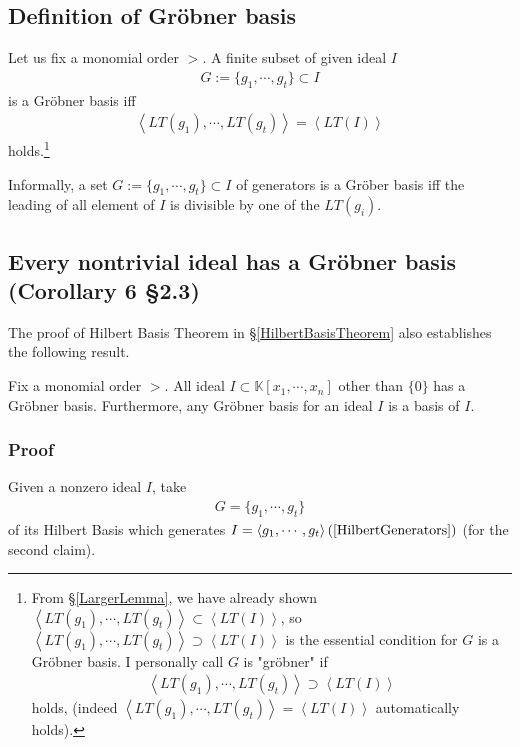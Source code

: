 \documentclass[11pt]{book}
\begin{document}
\subsection{Definition of Gr\"obner basis}
\label{DefOfGroebner}
Let us fix a monomial order $>$.
A finite subset of given ideal $I$
\begin{eqnarray}
G := \{g_1, \cdots, g_t\} \subset I
\end{eqnarray}
is a Gr\"obner basis iff 
\begin{eqnarray}
\left< LT(g_1), \cdots, LT(g_t) \right> = \left< LT(I)\right>
\end{eqnarray}
holds.\footnote{
From \S\ref{LargerLemma}, we have already shown $\left< LT(g_1), \cdots, LT(g_t) \right> \subset \left< LT(I) \right>$, so $\left< LT(g_1), \cdots, LT(g_t) \right> \supset \left< LT(I) \right>$ is the essential condition for $G$ is a Gr\"obner basis.
I personally call $G$ is "gr\"obner" if 
\begin{eqnarray}
\label{isGroebner}
\left< LT(g_1), \cdots, LT(g_t) \right> \supset \left< LT(I) \right>
\end{eqnarray}
holds, (indeed $\left< LT(g_1), \cdots, LT(g_t) \right> = \left< LT(I) \right>$ automatically holds).
}

Informally, a set $G := \{g_1, \cdots, g_t\} \subset I$ of generators is a Gr\"ober basis iff the leading of all element of $I$ is divisible by one of the $LT(g_i)$.


\subsection{Every nontrivial ideal has a Gr\"obner basis (Corollary 6 \S2.3)}
The proof of Hilbert Basis Theorem in \S\ref{HilbertBasisTheorem} also establishes the following result.

Fix a monomial order $>$.
All ideal $I \subset \mathbb{K}[x_1, \cdots, x_{n}]$ other than $\{0\}$ has a Gr\"obner basis.
Furthermore, any Gr\"obner basis for an ideal $I$ is a basis of $I$.

\subsubsection{Proof}
Given a nonzero ideal $I$, take
\begin{eqnarray}
G = \{g_1, \cdots, g_t\}
\end{eqnarray}
of its Hilbert Basis which generates $I = \left< g_1, \cdots, g_t \right> (\ref{HilbertGenerators})$ (for the second claim).
\end{document}
